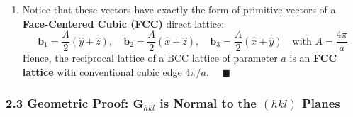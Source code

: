 \documentclass[11pt,a4paper]{article}
\begin{document}
\begin{solbox}
\begin{enumerate}
\begin{equation}
    \end{equation}
    \item Notice that these vectors have exactly the form of primitive vectors of a \textbf{Face-Centered Cubic (FCC)} direct lattice:
    \begin{equation}
    \mathbf{b}_1 = \frac{A}{2}(\hat{y} + \hat{z}), \quad \mathbf{b}_2 = \frac{A}{2}(\hat{x} + \hat{z}), \quad \mathbf{b}_3 = \frac{A}{2}(\hat{x} + \hat{y}) \quad \text{with } A = \frac{4\pi}{a}
    \end{equation}
    Hence, the reciprocal lattice of a BCC lattice of parameter $a$ is an \textbf{FCC lattice} with conventional cubic edge $4\pi/a$. $\quad\blacksquare$
\end{enumerate}
\end{solbox}

\subsubsection{2.3 Geometric Proof: \texorpdfstring{$\mathbf{G}_{hkl}$}{G\_hkl} is Normal to the \texorpdfstring{$(hkl)$}{(hkl)} Planes}
\end{document}
